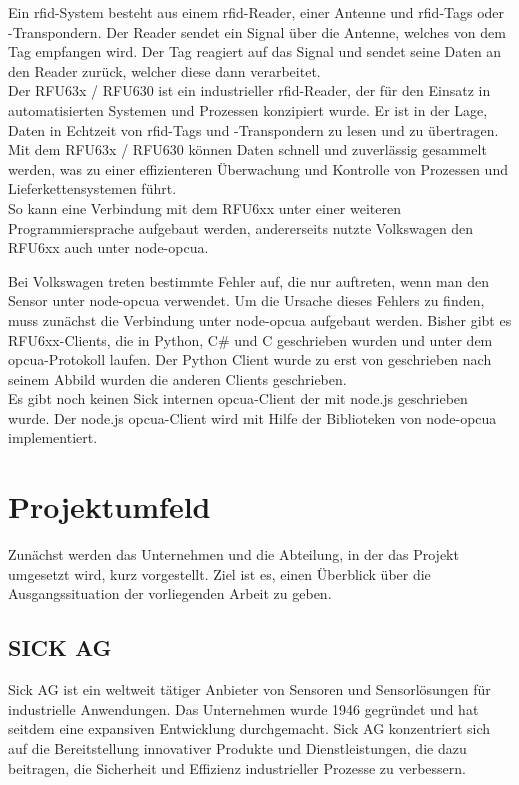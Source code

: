 Ein \ac{rfid}-System besteht aus einem \ac{rfid}-Reader, einer Antenne und \ac{rfid}-Tags oder -Transpondern. Der Reader sendet ein Signal über die Antenne, welches von dem Tag empfangen wird. Der Tag reagiert auf das Signal und sendet seine Daten an den Reader zurück, welcher diese dann verarbeitet.\\

Der RFU63x / RFU630 ist ein industrieller \ac{rfid}-Reader, der für den Einsatz in automatisierten Systemen und Prozessen konzipiert wurde. Er ist in der Lage, Daten in Echtzeit von \ac{rfid}-Tags und -Transpondern zu lesen und zu übertragen. Mit dem RFU63x / RFU630 können Daten schnell und zuverlässig gesammelt werden, was zu einer effizienteren Überwachung und Kontrolle von Prozessen und Lieferkettensystemen führt.\\

So kann eine Verbindung mit dem RFU6xx unter einer weiteren Programmiersprache aufgebaut werden, andererseits nutzte Volkswagen den RFU6xx auch unter node-opcua.

Bei Volkswagen treten bestimmte Fehler auf, die nur auftreten, wenn man den Sensor unter node-opcua verwendet. Um die Ursache dieses Fehlers zu finden, muss zunächst die Verbindung unter node-opcua aufgebaut werden.
Bisher gibt es RFU6xx-Clients, die in Python, C\# und C geschrieben wurden und unter dem \ac{opcua}-Protokoll laufen. 
Der Python Client wurde zu erst von \BetreuerFirma geschrieben nach seinem Abbild wurden die anderen Clients geschrieben. \\
Es gibt noch keinen Sick internen \ac{opcua}-Client der mit node.js geschrieben wurde. Der node.js \ac{opcua}-Client wird mit Hilfe der Biblioteken von node-opcua \cite{GitHub.06.02.2023} implementiert.\\

\section{Projektumfeld}
Zunächst werden das Unternehmen und die Abteilung, in der das Projekt umgesetzt wird,
kurz vorgestellt. Ziel ist es, einen Überblick über die Ausgangssituation der vorliegenden
Arbeit zu geben.

\iffalse
\subsection{SICK AG}

Sick AG ist ein weltweit tätiger Anbieter von Sensoren und Sensorlösungen für industrielle Anwendungen. Das Unternehmen wurde 1946 gegründet und hat seitdem eine expansiven Entwicklung durchgemacht. Sick AG konzentriert sich auf die Bereitstellung innovativer Produkte und Dienstleistungen, die dazu beitragen, die Sicherheit und Effizienz industrieller Prozesse zu verbessern.\\

